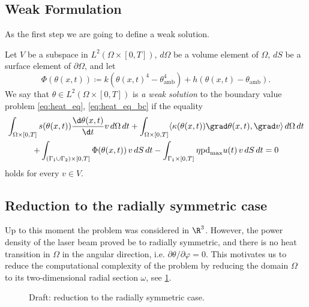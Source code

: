 \subsection{Weak Formulation}
As the first step we are going to define a weak solution.

\begin{definition}
	Let $V$ be a subspace in $L^2(\Omega \times [0,T])$, $d\Omega$ be a volume element of $\Omega$, $dS$ be a surface element of $\partial\Omega$, and let
	\begin{equation*}
		\Phi(\theta(x,t)) \coloneqq k (\theta(x,t)^4 - \theta_\text{amb}^4) + h (\theta(x,t) - \theta_\text{amb}).
	\end{equation*}
	We say that $\theta \in L^2(\Omega \times [0,T])$ is \emph{a weak solution} to the boundary value problem \eqref{eq:heat_eq}, \eqref{eq:heat_eq_bc} if the equality
	\begin{multline} \label{eq:weak}
		\int_{\Omega \times [0,T]} s(\theta(x,t)) \frac{\d \theta(x,t)}{\d t} v\, d\Omega\, dt
		+
		\int_{\Omega \times [0,T]} \langle \kappa(\theta(x,t)) \grad\theta(x,t), \grad v \rangle \, d\Omega\, dt \\
		+
		\int_{(\Gamma_1 \cup \Gamma_2) \times [0,T]} \Phi(\theta(x,t))\, v\, dS\, dt -
		\int_{\Gamma_1 \times [0,T]} \eta \text{pd}_{\max} u(t)\, v\, dS\, dt = 0
	\end{multline}
	holds for every $v\in V$.
\end{definition}


\subsection{Reduction to the radially symmetric case}

Up to this moment the problem was considered in $\R^3$.
However, the power density of the laser beam proved be to radially symmetric, and there is no heat transition in $\Omega$ in the angular direction, i.e. $\partial\theta/\partial\varphi = 0$. This motivates us to reduce the computational complexity of the problem by reducing the domain $\Omega$ to its two-dimensional radial section $\omega$, see \cref{fig:sec}.

\begin{figure}
	\centering
	
	
	\caption{Draft: reduction to the radially symmetric case.}
	\label{fig:sec}
\end{figure}

